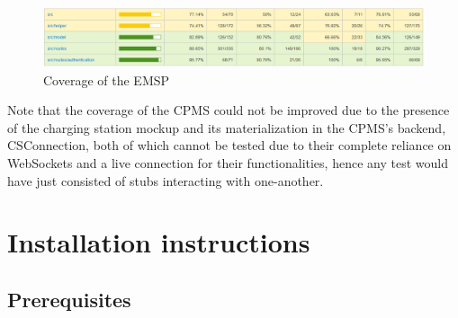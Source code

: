 \documentclass[11pt]{article}
\begin{document}
\begin{figure}[!ht]
    \centering
    \includegraphics[width=160mm]{EMSPCoverage.PNG}
    \captionsetup{justification=centering,margin=2cm}
    \caption{Coverage of the EMSP}
    \label{fig:my_label}
\end{figure}

Note that the coverage of the CPMS could not be improved due to the presence of the charging station mockup and its materialization in the CPMS's backend, CSConnection, both of which cannot be tested due to their complete reliance on WebSockets and a live connection for their functionalities, hence any test would have just consisted of stubs interacting with one-another.

\newpage

\section{Installation instructions}

\subsection{Prerequisites}
\end{document}
